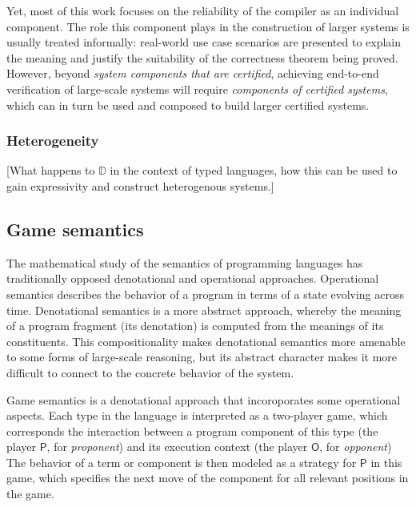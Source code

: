 \documentclass[acmsmall,timestamp,review,anonymous]{acmart}
\newcommand{\kw}[1]{\ensuremath{ \mathsf{#1} }}
\begin{document}
Yet, most of this work
focuses on the reliability of the compiler
as an individual component.
The role this component plays in the construction of larger systems
is usually treated informally:
real-world use case scenarios are presented
to explain the meaning and justify the suitability
of the correctness theorem being proved.
However,
beyond \emph{system components that are certified},
achieving end-to-end verification of large-scale systems
will require \emph{components of certified systems},
which can in turn be used and composed
to build larger certified systems.


\subsubsection{Heterogeneity} %

[What happens to $\mathbb{D}$ in the context of typed languages,
how this can be used to gain expressivity and construct heterogenous systems.]



\subsection{Game semantics} %


The mathematical study of the semantics of programming languages
has traditionally opposed denotational and operational approaches.
Operational semantics describes
the behavior of a program in terms of
a state evolving across time.
Denotational semantics is a more abstract approach,
whereby the meaning of a program fragment (its denotation)
is computed from the meanings of its constituents.
This compositionality makes denotational semantics
more amenable to some forms of large-scale reasoning,
but its abstract character makes it more difficult
to connect to the concrete behavior of the system.

Game semantics is a denotational approach that
incoroporates some operational aspects.
Each type in the language
is interpreted as a two-player game,
which corresponds the interaction
between a program component of this type
(the player \kw{P}, for \emph{proponent})
and its execution context
(the player \kw{O}, for \emph{opponent})
The behavior of a term or component
is then modeled as a strategy for \kw{P} in this game,
which specifies the next move of the component
for all relevant positions in the game.
\end{document}
